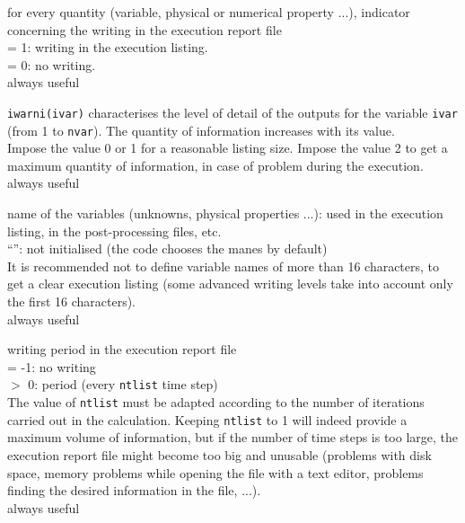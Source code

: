 {for every quantity (variable, physical or numerical property ...),
indicator concerning the writing in the execution report file \\
\hspace*{1.3cm}= 1: writing in the execution listing.\\
\hspace*{1.3cm}= 0: no writing.\\
always useful}

{{\tt iwarni(ivar)} characterises the level of detail of the outputs for the
variable {\tt ivar} (from 1 to {\tt nvar}). The quantity of information
increases with its value.\\
Impose the value 0 or 1 for a reasonable listing size. Impose the value 2
to get a maximum quantity of information, in case of problem during the
execution.\\
always useful}

{name of the variables (unknowns, physical properties ...): used in the
execution listing, in the post-processing files, etc.\\
{``''}: not initialised (the code chooses the manes by default)\\
It is recommended not to define variable names of more than 16
characters, to get a clear execution listing (some advanced writing
levels take into account only the first 16 characters).\\
always useful}

{writing period in the execution report file\\
\hspace*{1.3cm}= -1: no writing\\
\hspace*{1.3cm}$>$ 0: period (every {\tt ntlist} time step)\\
The value of {\tt ntlist} must be adapted according to the number of iterations
carried out in the calculation. Keeping {\tt ntlist} to 1 will indeed provide
a maximum volume of information, but if the number of time steps is too large,
the execution report file might become too big and unusable
(problems with disk space, memory problems while opening the file with a text
editor, problems finding the desired information in the file, ...).\\
always useful}

